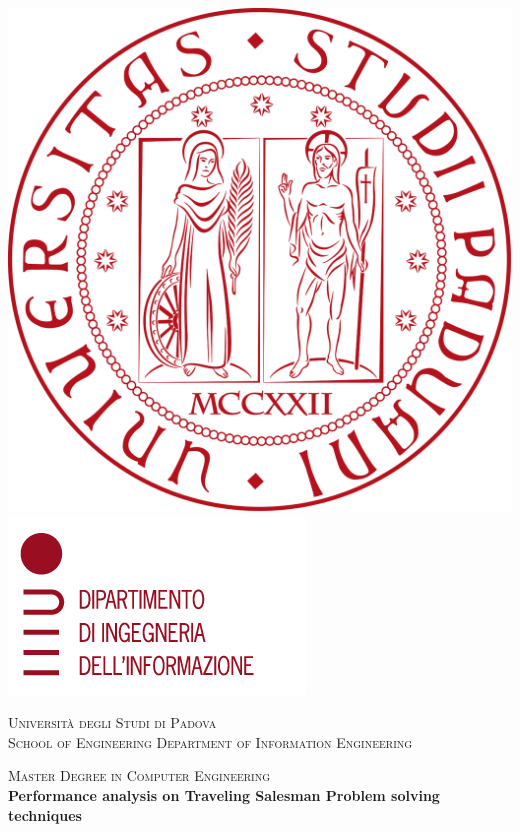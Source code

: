 \documentclass[a4paper,12pt]{report}
\begin{document}
\begin{titlepage}
\begin{center}

\includegraphics[height=0.13\textheight]{logo_unipd.png}
\hfill
\includegraphics[height=0.13\textheight]{logo_dei.png}
\newline
\newline

\vspace{0.8cm}
\textsc{\LARGE Universit\`{a} degli Studi di Padova}\\
\vspace{1.6cm}
\textsc{\large 	School of Engineering Department of Information Engineering}\\
\vspace{0.4cm}

\textsc{\large Master Degree in Computer Engineering}\\
\vfill
{ \LARGE \bfseries Performance analysis on Traveling Salesman Problem solving techniques}\\
\vspace{.2cm}


\end{center}
\end{titlepage}
\end{document}
